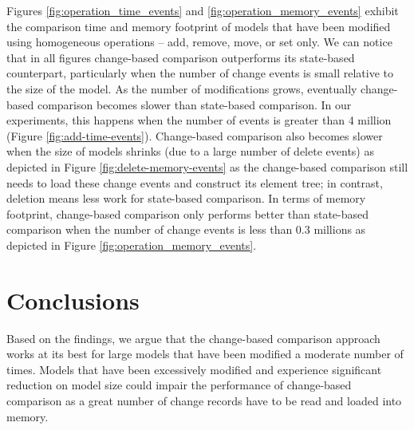 Figures \ref{fig:operation_time_events} and \ref{fig:operation_memory_events} exhibit the comparison time and memory footprint of models that have been modified using homogeneous operations -- \textsf{add}, \textsf{remove}, \textsf{move}, or \textsf{set} only. We can notice that in all figures change-based comparison outperforms its state-based counterpart, particularly when the number of change events is small relative to the size of the model. As the number of modifications grows, eventually change-based comparison becomes slower than state-based comparison. In our experiments, this happens when the number of events is greater than 4 million (Figure \ref{fig:add-time-events}). Change-based comparison also becomes slower when the size of models shrinks (due to a large number of delete events) as depicted in Figure \ref{fig:delete-memory-events} as the change-based comparison still needs to load these change events and construct its element tree; in contrast, deletion means less work for state-based comparison. In terms of memory footprint, change-based comparison only performs better than state-based comparison when the number of change events is less than 0.3 millions as depicted in Figure \ref{fig:operation_memory_events}.

\section{Conclusions}
\label{sec:conclusions_6}

Based on the findings, we argue that the change-based comparison approach works at its best for large models that have been modified a moderate number of times. Models that have been excessively modified and experience significant reduction on model size could impair the performance of change-based comparison as a great number of change records have to be read and loaded into memory. 
